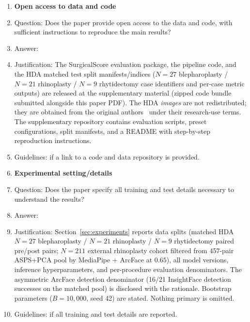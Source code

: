\begin{enumerate}
\item {\bf Open access to data and code}
    \item[] Question: Does the paper provide open access to the data and code, with sufficient instructions to reproduce the main results?
    \item[] Answer: \answerYes{}
    \item[] Justification: The SurgicalScore evaluation package, the \method{} pipeline code, and the HDA matched test split manifests/indices ($N{=}27$ blepharoplasty / $N{=}21$ rhinoplasty / $N{=}9$ rhytidectomy case identifiers and per-case metric outputs) are released at the supplementary material (zipped code bundle submitted alongside this paper PDF). The HDA \emph{images} are not redistributed; they are obtained from the original authors~\citep{rathgeb2020plastic} under their research-use terms. The supplementary repository contains evaluation scripts, preset configurations, split manifests, and a README with step-by-step reproduction instructions.
    \item[] Guidelines: \answerYes{} if a link to a code and data repository is provided.

\item {\bf Experimental setting/details}
    \item[] Question: Does the paper specify all training and test details necessary to understand the results?
    \item[] Answer: \answerYes{}
    \item[] Justification: Section~\ref{sec:experiments} reports data splits (matched HDA $N{=}27$ blepharoplasty / $N{=}21$ rhinoplasty / $N{=}9$ rhytidectomy paired pre/post pairs; $N{=}211$ external rhinoplasty cohort filtered from 457-pair ASPS+PCA pool by MediaPipe + ArcFace at $0.65$), all model versions, inference hyperparameters, and per-procedure evaluation denominators. The asymmetric ArcFace detection denominator (16/21 InsightFace detection successes on the matched pool) is disclosed with the rationale. Bootstrap parameters ($B{=}10{,}000$, seed 42) are stated. Nothing primary is omitted.
    \item[] Guidelines: \answerYes{} if all training and test details are reported.


\end{enumerate}
